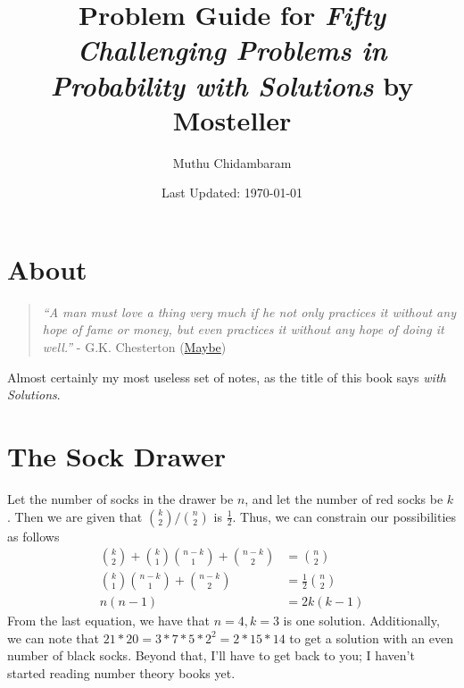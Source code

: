 \documentclass{article}
\begin{document}
\title{Problem Guide for \textit{Fifty Challenging Problems in Probability with Solutions} by Mosteller}
\author{Muthu Chidambaram}
\date{Last Updated: \today}

\maketitle

\tableofcontents
\newpage 

\section*{About}

\begin{quote}
        \textit{``A man must love a thing very much if he not only practices it without any hope of fame or money, but even practices it without any hope of doing it well.''} 
        - G.K. Chesterton (\href{https://mathoverflow.net/questions/43690/whats-a-mathematician-to-do/44213#44213}{Maybe})
\end{quote}

Almost certainly my most useless set of notes, as the title of this book says \textit{with Solutions}. 

\newpage

\section{The Sock Drawer}
Let the number of socks in the drawer be $n$, and let the number of red socks be $k$. Then we are given that
$\binom{k}{2} / \binom{n}{2}$ is $\frac{1}{2}$. Thus, we can constrain our possibilities as follows
\begin{align*}
        \binom{k}{2} + \binom{k}{1} \binom{n - k}{1} + \binom{n - k}{2} &= \binom{n}{2} \\
        \binom{k}{1} \binom{n - k}{1} + \binom{n - k}{2} &= \frac{1}{2} \binom{n}{2} \\
        n(n - 1) &= 2k(k - 1)
\end{align*}
From the last equation, we have that $n = 4, k = 3$ is one solution. Additionally, we can note that
 $21 * 20 = 3 * 7 * 5 * 2^2 = 2 * 15 * 14$ to get a solution with an even number of black socks. 
 Beyond that, I'll have to get back to you; I haven't started reading number theory books yet.
\end{document}
